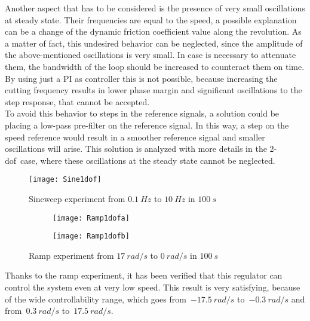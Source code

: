 Another aspect that has to be considered is the presence of very small oscillations at steady state. Their frequencies are equal to the speed, a possible explanation can be a change of the dynamic friction coefficient value along the revolution. As a matter of fact, this undesired behavior can be neglected, since the amplitude of the above-mentioned oscillations is very small. In case is necessary to attenuate them, the bandwidth of the loop should be increased to counteract them on time. By using just a PI as controller this is not possible, because increasing the cutting frequency results in lower phase margin and significant oscillations to the step response, that cannot be accepted. \\
To avoid this behavior to steps in the reference signals, a solution could be placing a low-pass pre-filter on the reference signal. In this way, a step on the speed reference would result in a smoother reference signal and smaller oscillations will arise. This solution is analyzed with more details in the \acrshort{2-dof}\ case, where these oscillations at the steady state cannot be neglected.
\begin{figure*}[h]
	\centering
	\texttt{[image: Sine1dof]}
	\caption{Sineweep experiment from $0.1\ Hz$ to $10\ Hz$ in $100\ s$}
	\label{fig:sinesweep_PI_1dof}
\end{figure*}

\begin{figure*}[h]
	\centering
	\begin{subfigure}{0.45\columnwidth}
		\texttt{[image: Ramp1dofa]}
	\end{subfigure}
	\begin{subfigure}{0.45\columnwidth}
		\texttt{[image: Ramp1dofb]}
	\end{subfigure}
	\caption{Ramp experiment from $17\ rad/s$ to $0\ rad/s$ in $100\ s$}
	\label{fig:Ramp1dof}
\end{figure*}

Thanks to the ramp experiment, it has been verified that this regulator can control the system even at very low speed. This result is very satisfying, because of the wide controllability range, which goes from~$-17.5\ rad/s$ to~$-0.3\ rad/s$ and from~$0.3\ rad/s$ to~$17.5\ rad/s$.

\newpage

